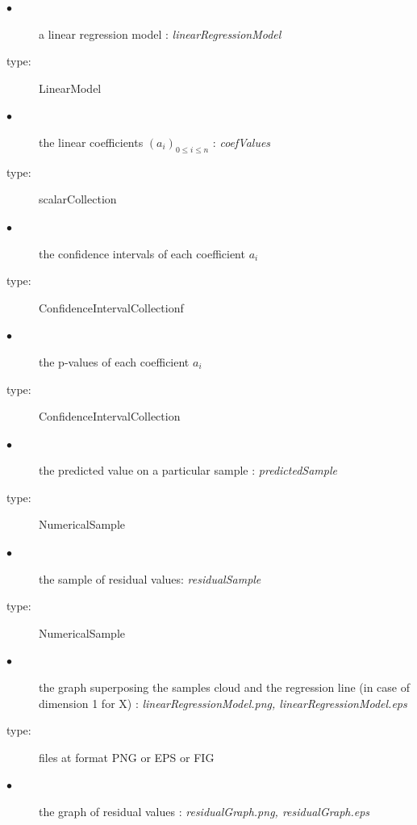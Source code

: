                  {
                   \begin{description}
                   \item[$\bullet$] a linear regression model : {\itshape linearRegressionModel}
                   \item[type:]  LinearModel
                   \item[$\bullet$] the linear coefficients $(a_i)_{0 \leq i \leq n}$ : {\itshape coefValues}
                   \item[type:] scalarCollection
                   \item[$\bullet$] the confidence intervals of each coefficient $a_i$
                   \item[type:]  ConfidenceIntervalCollectionf
                   \item[$\bullet$] the p-values of each coefficient $a_i$
                   \item[type:]  ConfidenceIntervalCollection
                   \item[$\bullet$] the predicted value on a particular sample : {\itshape predictedSample}
                   \item[type:] NumericalSample
                   \item[$\bullet$] the sample of residual values: {\itshape residualSample}
                   \item[type:] NumericalSample
                   \item[$\bullet$] the graph superposing the samples cloud and the regression line (in case of dimension 1 for X) : {\itshape linearRegressionModel.png, linearRegressionModel.eps}
                   \item[type:]  files at format PNG or EPS or FIG
                   \item[$\bullet$] the graph of residual values : {\itshape residualGraph.png, residualGraph.eps}

\end{description}}
